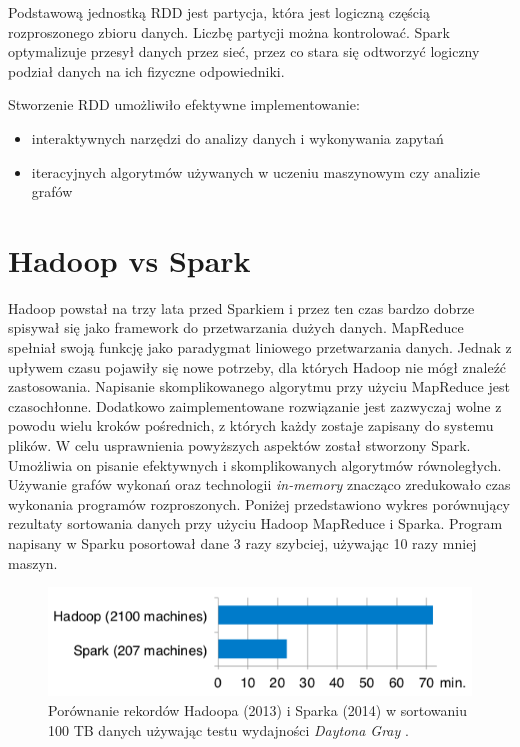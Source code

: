 \documentclass{pracamgr}
\begin{document}
Podstawową jednostką RDD jest partycja, która jest logiczną częścią rozproszonego zbioru danych. Liczbę partycji można kontrolować. Spark optymalizuje przesył danych przez sieć, przez co stara się odtworzyć logiczny podział danych na ich fizyczne odpowiedniki.

Stworzenie RDD umożliwiło efektywne implementowanie:
\begin{itemize}
    \item interaktywnych narzędzi do analizy danych i wykonywania zapytań
    \item iteracyjnych algorytmów używanych w uczeniu maszynowym czy analizie grafów
\end{itemize}

\section{Hadoop vs Spark}

Hadoop powstał na trzy lata przed Sparkiem i przez ten czas bardzo dobrze spisywał się jako framework do przetwarzania dużych danych. MapReduce spełniał swoją funkcję jako paradygmat liniowego przetwarzania danych. Jednak z upływem czasu pojawiły się nowe potrzeby, dla których Hadoop nie mógł znaleźć zastosowania. Napisanie skomplikowanego algorytmu przy użyciu MapReduce jest czasochłonne. Dodatkowo zaimplementowane rozwiązanie jest zazwyczaj wolne z powodu wielu kroków pośrednich, z których każdy zostaje zapisany do systemu plików. W celu usprawnienia powyższych aspektów został stworzony Spark. Umożliwia on pisanie efektywnych i skomplikowanych algorytmów równoległych. Używanie grafów wykonań oraz technologii \textit{in-memory} znacząco zredukowało czas wykonania programów rozproszonych. Poniżej przedstawiono wykres porównujący rezultaty sortowania danych przy użyciu Hadoop MapReduce i Sparka. Program napisany w Sparku posortował dane 3 razy szybciej, używając 10 razy mniej maszyn.


\begin{figure}[H]
    \caption{Porównanie rekordów Hadoopa (2013) i Sparka (2014) w sortowaniu 100 TB danych używając testu wydajności \textit{Daytona Gray} \cite{Armbrust:2015:SSR:2824032.2824080}.}
    \includegraphics[width=15cm]{hadoop_vs_spark.png}
\end{figure}
\end{document}
